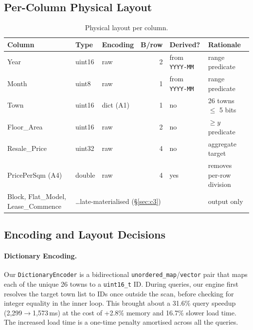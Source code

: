 \documentclass[11pt,a4paper]{article}
\begin{document}
\subsection{Per-Column Physical Layout}\label{sec:layout}

\begin{table}[H]\centering\footnotesize
\begin{tabular}{@{}lllrll@{}}
\toprule
Column & Type & Encoding & B/row & Derived? & Rationale \\
\midrule
Year              & uint16 & raw       & 2 & from \texttt{YYYY-MM} & range predicate \\
Month             & uint8  & raw       & 1 & from \texttt{YYYY-MM} & range predicate \\
Town              & uint16  & dict (A1) & 1 & no  & 26 towns $\le$ 5 bits \\
Floor\_Area       & uint16 & raw       & 2 & no  & $\ge y$ predicate \\
Resale\_Price     & uint32 & raw       & 4 & no  & aggregate target \\
PricePerSqm (A4)  & double & raw       & 4 & yes & removes per-row division \\
Block, Flat\_Model, Lease\_Commence & \multicolumn{4}{l}{\dots\quad late-materialised (\S\ref{sec:c3})} & output only \\
\bottomrule
\end{tabular}
\caption{Physical layout per column.}\label{tab:layout}
\end{table}

\subsection{Encoding and Layout Decisions}\label{sec:layout-discussion}

\paragraph{Dictionary Encoding.}
Our \texttt{DictionaryEncoder} is a bidirectional \texttt{unordered\_map}/\texttt{vector} pair that maps each of the unique 26 towns to a \texttt{uint16\_t} ID.
During queries, our engine first resolves the target town list to IDs once outside the scan, before checking for integer equality in the inner loop.
This brought about a 31.6\% query speedup (2,299$\to$1,573\,ms) at the cost of +2.8\% memory and 16.7\% slower load time.
The increased load time is a one-time penalty amortised across all the queries.
\end{document}
